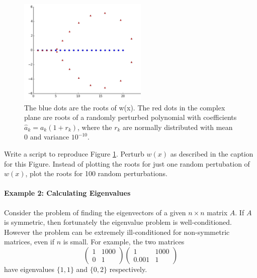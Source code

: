 \begin{figure}[h!]
\centering
\includegraphics[height=2in]{wilkinsonpolynomial.pdf}
\caption{The blue dots are the roots of w(x). The red dots in the complex plane are roots of a randomly perturbed polynomial with coefficients $\hat{a}_k = a_k(1+r_k)$, where the $r_k$ are normally distributed with mean $0$ and variance $10^{-10}$.}
\label{fig:wilkinsonpolynomial}
\end{figure}

\begin{problem}
Write a script to reproduce Figure \ref{fig:wilkinsonpolynomial}. Perturb $w(x)$ as described in the caption for this Figure. Instead of plotting the roots for just one random pertubation of $w(x)$, plot the roots for 100 random perturbations.
\end{problem}

\paragraph{Example 2: Calculating Eigenvalues}

Consider the problem of finding the eigenvectors of a given $n \times n$ matrix $A$. If $A$ is symmetric, then fortunately the eigenvalue problem is well-conditioned. However the problem can be extremely ill-conditioned for non-symmetric matrices, even if $n$ is small. For example, the two matrices 
\[ \left( \begin{array}{cc}
1 & 1000 \\
0 & 1
\end{array} \right)
%
\left( \begin{array}{cc}
1 & 1000 \\
0.001 & 1
\end{array} \right)
\]
have eigenvalues $\{ 1,1\}$ and $\{0,2 \}$ respectively.

